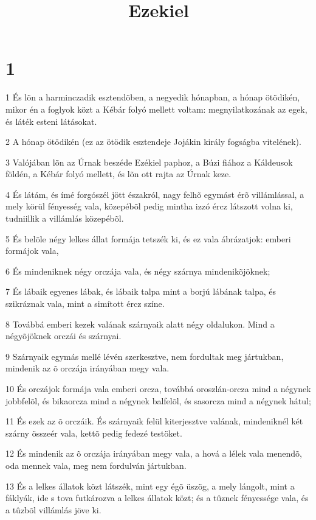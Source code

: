 

\title{Ezekiel}


\chapter{1}

\par 1 És lõn a harminczadik esztendõben, a negyedik hónapban, a hónap ötödikén, mikor én a foglyok közt a Kébár folyó mellett voltam: megnyilatkozának az egek, és láték esteni látásokat.
\par 2 A hónap ötödikén (ez az ötödik esztendeje Jojákin király fogságba vitelének).
\par 3 Valójában lõn az Úrnak beszéde Ezékiel paphoz, a Búzi fiához a Káldeusok földén, a Kébár folyó mellett, és lõn ott rajta az Úrnak keze.
\par 4 És látám, és ímé forgószél jött északról, nagy felhõ egymást érõ villámlással, a mely körül fényesség vala, közepébõl pedig mintha izzó ércz látszott volna ki, tudniillik a villámlás közepébõl.
\par 5 És belõle négy lelkes állat formája tetszék ki, és ez vala ábrázatjok: emberi formájok vala,
\par 6 És mindeniknek négy orczája vala, és négy szárnya mindenikõjöknek;
\par 7 És lábaik egyenes lábak, és lábaik talpa mint a borjú lábának talpa, és szikráznak vala, mint a simított ércz színe.
\par 8 Továbbá emberi kezek valának szárnyaik alatt négy oldalukon. Mind a négyõjöknek orczái és szárnyai.
\par 9 Szárnyaik egymás mellé lévén szerkesztve, nem fordultak meg jártukban, mindenik az õ orczája irányában megy vala.
\par 10 És orczájok formája vala emberi orcza, továbbá oroszlán-orcza mind a négynek jobbfelõl, és bikaorcza mind a négynek balfelõl, és sasorcza mind a négynek hátul;
\par 11 És ezek az õ orczáik. És szárnyaik felül kiterjesztve valának, mindeniknél két szárny összeér vala, kettõ pedig fedezé testöket.
\par 12 És mindenik az õ orczája irányában megy vala, a hová a lélek vala menendõ, oda mennek vala, meg nem fordulván jártukban.
\par 13 És a lelkes állatok közt látszék, mint egy égõ üszög, a mely lángolt, mint a fáklyák, ide s tova futkározva a lelkes állatok közt; és a tûznek fényessége vala, és a tûzbõl villámlás jöve ki.
